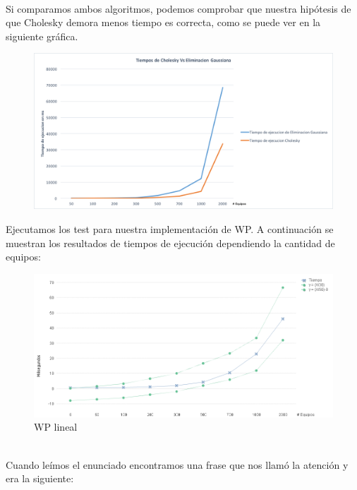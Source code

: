 \\

Si comparamos ambos algoritmos, podemos comprobar que nuestra hipótesis de que Cholesky demora menos tiempo es correcta, como se puede ver en la siguiente gráfica.

\begin{figure}[H]
    \centering
    \includegraphics[width=1\textwidth]{IMG/tiemposgsvscholesky.png}
\end{figure}


Ejecutamos los test para nuestra implementación de WP. A continuación se muestran los resultados de tiempos de ejecución dependiendo la cantidad de equipos: \\


\begin{figure}[H]
    \centering
    \includegraphics[width=1\textwidth]{IMG/wp lineal.png}
    \caption{WP lineal}
    \label{fig:WP lineal}
\end{figure}

\\

Cuando leímos el enunciado encontramos una frase que nos llamó la atención y era la siguiente: \\

